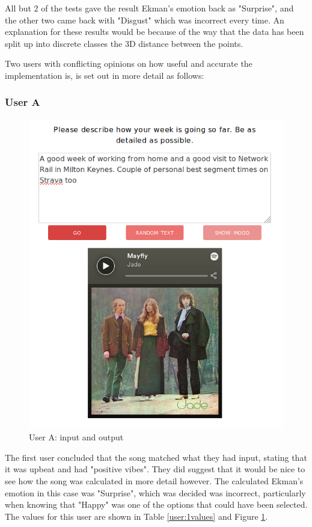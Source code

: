 All but 2 of the tests gave the result Ekman's emotion back as "Surprise", and the other two came back with "Disgust" which was incorrect every time. An explanation for these results would be because of the way that the data has been split up into discrete classes the 3D distance between the points.

Two users with conflicting opinions on how useful and accurate the implementation is, is set out in more detail as follows:


\subsubsection{User A}

\begin{figure}[h]
\centering
\includegraphics[scale=0.4]{implementation/malc-user.png}
\caption{User A: input and output}
\label{user:1}
\end{figure}

The first user concluded that the song matched what they had input, stating that it was upbeat and had "positive vibes". They did suggest that it would be nice to see how the song was calculated in more detail however. The calculated Ekman's emotion in this case was "Surprise", which was decided was incorrect, particularly when knowing that "Happy" was one of the options that could have been selected. The values for this user are shown in Table \ref{user:1values} and Figure \ref{user:1}.


